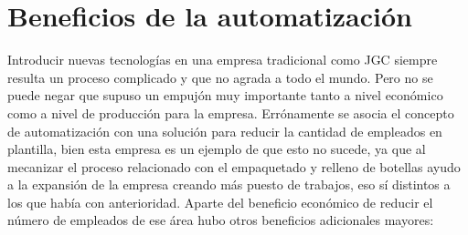 \documentclass[11pt,a4paper,spanish,twoside]{report}
\begin{document}
\chapter{Beneficios de la automatización}
Introducir nuevas tecnologías en una empresa tradicional como JGC siempre
resulta un proceso complicado y que no agrada a todo el mundo. Pero no se
puede negar que supuso un empujón muy importante tanto a nivel económico como
a nivel de producción para la empresa. Errónamente se asocia el concepto de
automatización con una solución para reducir la cantidad de empleados en
plantilla, bien esta empresa es un ejemplo de que esto no sucede, ya que al
mecanizar el proceso relacionado con el empaquetado y relleno de botellas
ayudo a la expansión de la empresa creando más puesto de trabajos, eso sí
distintos a los que había con anterioridad. Aparte del beneficio económico de
reducir el número de empleados de ese área hubo otros beneficios adicionales
mayores:
\end{document}
